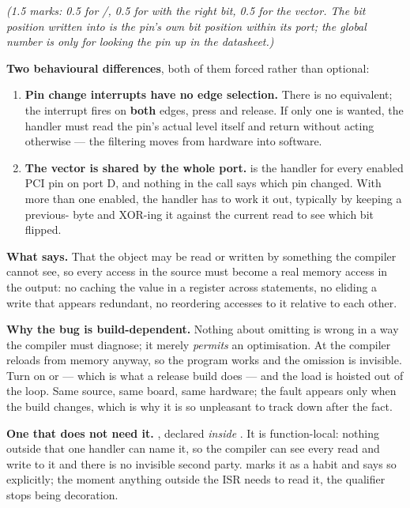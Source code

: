 \noindent\textit{(1.5 marks: 0.5 for /, 0.5 for  with the right
bit, 0.5 for the vector. The bit position written into  is the pin's own bit position
within its port; the global  number is only for looking the pin up in the
datasheet.)}

\textbf{Two behavioural differences}, both of them forced rather than optional:
\begin{enumerate}
  \item \textbf{Pin change interrupts have no edge selection.} There is no  equivalent;
    the interrupt fires on \textbf{both} edges, press and release. If only one is wanted, the
    handler must read the pin's actual level itself and return without acting otherwise --- the
    filtering moves from hardware into software.
  \item \textbf{The vector is shared by the whole port.}  is the handler for every
    enabled PCI pin on port D, and nothing in the call says which pin changed. With more than one
    enabled, the handler has to work it out, typically by keeping a previous- byte and
    XOR-ing it against the current read to see which bit flipped.
\end{enumerate}

\textbf{What  says.} That the object may be read or written by something the
compiler cannot see, so every access in the source must become a real memory access in the output:
no caching the value in a register across statements, no eliding a write that appears redundant, no
reordering accesses to it relative to each other. 

\textbf{Why the bug is build-dependent.} Nothing about omitting  is wrong in a way
the compiler must diagnose; it merely \emph{permits} an optimisation. At  the compiler
reloads from memory anyway, so the program works and the omission is invisible. Turn on 
or  --- which is what a release build does --- and the load is hoisted out of the loop.
Same source, same board, same hardware; the fault appears only when the build changes, which is why
it is so unpleasant to track down after the fact. 

\textbf{One that does not need it.} , declared \emph{inside}
. It is function-local: nothing outside that one handler can name it, so
the compiler can see every read and write to it and there is no invisible second party.
 marks it  as a habit and says so explicitly; the moment anything
outside the ISR needs to read it, the qualifier stops being decoration. 

